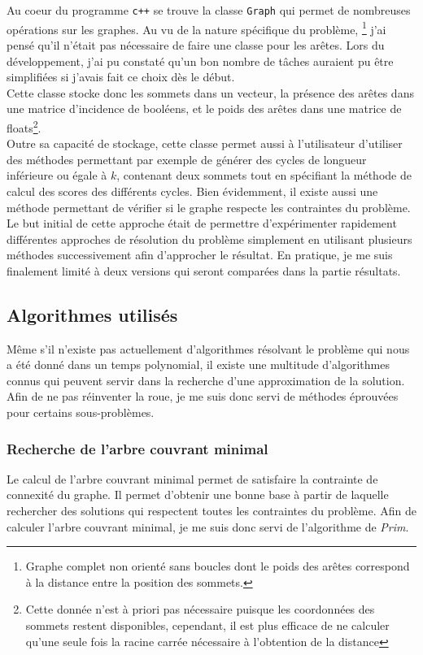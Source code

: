\documentclass[a4paper,12pt]{article}
\begin{document}
Au coeur du programme \verb!c++! se trouve la classe \verb!Graph! qui permet de
nombreuses opérations sur les graphes. Au vu de la nature spécifique du
problème, \footnote{Graphe complet non orienté sans boucles dont le poids des
arêtes correspond à la distance entre la position des sommets.} j'ai pensé
qu'il n'était pas nécessaire de faire une classe pour les arêtes. Lors du
développement, j'ai pu constaté qu'un bon nombre de tâches auraient pu être
simplifiées si j'avais fait ce choix dès le début.
\\
Cette classe stocke donc les sommets dans un vecteur, la présence des arêtes
dans une matrice d'incidence de booléens, et le poids des arêtes dans une
matrice de floats\footnote{Cette donnée n'est à priori pas nécessaire puisque
les coordonnées des sommets restent disponibles, cependant, il est plus efficace
de ne calculer qu'une seule fois la racine carrée nécessaire à l'obtention de la
distance}.
\\
Outre sa capacité de stockage, cette classe permet aussi à l'utilisateur
d'utiliser des méthodes permettant par exemple de générer des cycles de longueur
inférieure ou égale à $k$, contenant deux sommets tout en spécifiant la méthode
de calcul des scores des différents cycles. Bien évidemment, il existe aussi une
méthode permettant de vérifier si le graphe respecte les contraintes du
problème. Le but initial de cette approche était de permettre d'expérimenter
rapidement différentes approches de résolution du problème simplement en
utilisant plusieurs méthodes successivement afin d'approcher le résultat. En
pratique, je me suis finalement limité à deux versions qui seront comparées dans
la partie résultats.

\subsection{Algorithmes utilisés}
Même s'il n'existe pas actuellement d'algorithmes résolvant le problème qui nous
a été donné dans un temps polynomial, il existe une multitude d'algorithmes
connus qui peuvent servir dans la recherche d'une approximation de la solution.
Afin de ne pas réinventer la roue, je me suis donc servi de méthodes éprouvées
pour certains sous-problèmes.

\subsubsection{Recherche de l'arbre couvrant minimal}
Le calcul de l'arbre couvrant minimal permet de satisfaire la contrainte
de connexité du graphe. Il permet d'obtenir une bonne base à partir de laquelle
rechercher des solutions qui respectent toutes les contraintes du problème.
Afin de calculer l'arbre couvrant minimal, je me suis donc servi de l'algorithme
de {\em Prim}.
\end{document}
